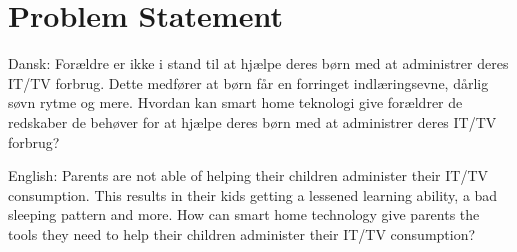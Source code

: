 \chapter{Problem Statement}

Dansk: Forældre er ikke i stand til at hjælpe deres børn med at administrer deres IT/TV forbrug.
Dette medfører at børn får en forringet indlæringsevne, dårlig søvn rytme og mere.
Hvordan kan smart home teknologi give forældrer de redskaber de behøver for at hjælpe deres børn med at administrer deres IT/TV forbrug?

English: Parents are not able of helping their children administer their IT/TV consumption.
This results in their kids getting a lessened learning ability, a bad sleeping pattern and more.
How can smart home technology give parents the tools they need to help their children administer their IT/TV consumption?